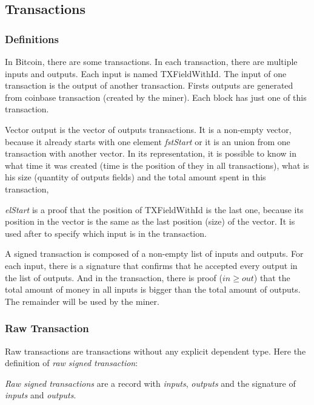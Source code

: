 \subsection{Transactions}

\subsubsection{Definitions}

In Bitcoin, there are some transactions.
In each transaction, there are multiple inputs and outputs.
Each input is named TXFieldWithId.
The input of one transaction is the output of another transaction.
Firsts outputs are generated from coinbase transaction (created by the miner).
Each block has just one of this transaction.


Vector output is the vector of outputs transactions.
It is a non-empty vector, because it already starts with one element \emph{fstStart}
or it is an union from one transaction with another vector.
In its representation, it is possible to know in what time it was created (time is the position of
they in all transactions),
what is his size (quantity of outputs fields)
and the total amount spent in this transaction,

\emph{elStart} is a proof that the position of TXFieldWithId is the last one,
because its position in the vector is the same as the last position (size) of the vector.
It is used after to specify which input is in the transaction.


A signed transaction is composed of a non-empty list of inputs and outputs.
For each input, there is a signature that confirms that he accepted every output in the list of outputs.
And in the transaction, there is proof ($in \geq out$) that the total amount of money
in all inputs is bigger than the total amount of outputs.
The remainder will be used by the miner.

\subsubsection{Raw Transaction}

Raw transactions are transactions without any explicit dependent type.
Here the definition of \emph{raw signed transaction}:


\emph{Raw signed transactions} are a record with \emph{inputs}, \emph{outputs}
and the signature of \emph{inputs} and \emph{outputs}.

